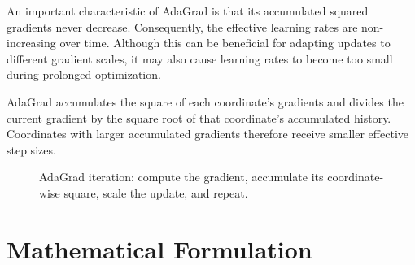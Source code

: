 \documentclass[11pt,a4paper]{article}
\begin{document}
An important characteristic of AdaGrad is that its accumulated squared gradients never decrease. Consequently, the effective learning rates are non-increasing over time. Although this can be beneficial for adapting updates to different gradient scales, it may also cause learning rates to become too small during prolonged optimization.

\begin{keyidea}
AdaGrad accumulates the square of each coordinate's gradients and divides the
current gradient by the square root of that coordinate's accumulated history.
Coordinates with larger accumulated gradients therefore receive smaller
effective step sizes.
\end{keyidea}

\begin{figure}[h]
\centering
{}
\caption{AdaGrad iteration: compute the gradient, accumulate its coordinate-wise square, scale the update, and repeat.}
\label{fig:adagrad-flow}
\end{figure}

\section{Mathematical Formulation}
\end{document}
